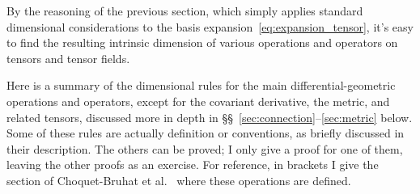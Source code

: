 \documentclass[\ifafour a4paper,12pt,\else a5paper,10pt,\fi%
onecolumn,oneside,article,%
british%
]{memoir}
\theoremstyle{remark}
\theoremstyle{innote}
\newcommand*{\citey}{\parencites*}%
\renewcommand*{\|}[1][]{\nonscript\,#1\vert\nonscript\;\mathopen{}}
\newcommand*{\sects}{\S\S}%
\newcommand*{\etal}{{et al.}}
\begin{document}
By the reasoning of the previous section, which simply applies standard
dimensional considerations to the basis
expansion~\eqref{eq:expansion_tensor}, it's easy to find the resulting
intrinsic dimension of various operations and operators on tensors and
tensor fields.

Here is a summary of the dimensional rules for the main
differential-geometric operations and operators, except for the covariant
derivative, the metric, and related tensors, discussed more in depth in
\sects~\ref{sec:connection}--\ref{sec:metric} below. Some of these rules
are actually definition or conventions, as briefly discussed in their
description. The others can be proved; I only give a proof for one of them,
leaving the other proofs as an exercise. For reference, in brackets I give
the section of Choquet-Bruhat \etal\ \citey{choquetbruhatetal1977_r1996}
where these operations are defined.
\end{document}
